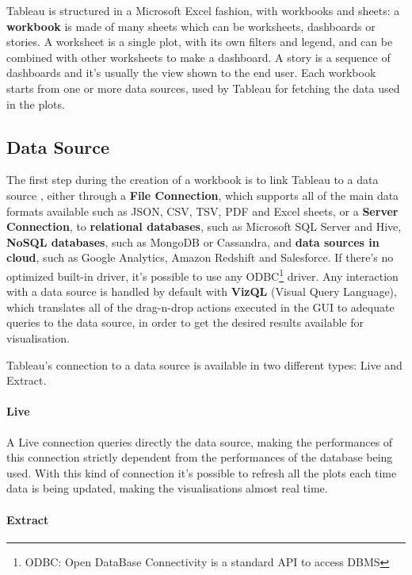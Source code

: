 Tableau is structured in a Microsoft Excel fashion, with workbooks and sheets: a \textbf{workbook} is made of many sheets which can be worksheets, dashboards or stories. A worksheet is a single plot, with its own filters and legend, and can be combined with other worksheets to make a dashboard. A story is a sequence of dashboards and it's usually the view shown to the end user. Each workbook starts from one or more data sources, used by Tableau for fetching the data used in the plots.

\subsection{Data Source}

The first step during the creation of a workbook is to link Tableau to a data source \cite{LearningTableau}, either through a \textbf{File Connection}, which supports all of the main data formats available such as JSON, CSV, TSV, PDF and Excel sheets, or a \textbf{Server Connection}, to \textbf{relational databases}, such as Microsoft SQL Server and Hive, \textbf{NoSQL databases}, such as MongoDB or Cassandra, and \textbf{data sources in cloud}, such as Google Analytics, Amazon Redshift and Salesforce. If there's no optimized built-in driver, it's possible to use any ODBC\footnote{ODBC: Open DataBase Connectivity is a standard API to access DBMS} driver. Any interaction with a data source is handled by default with \textbf{VizQL} (Visual Query Language), which translates all of the drag-n-drop actions executed in the GUI to adequate queries to the data source, in order to get the desired results available for visualisation.

Tableau's connection to a data source is available in two different types: Live and Extract.

\paragraph{Live}

A Live connection queries directly the data source, making the performances of this connection strictly dependent from the performances of the database being used. With this kind of connection it's possible to refresh all the plots each time data is being updated, making the visualisations almost real time.

\paragraph{Extract}

